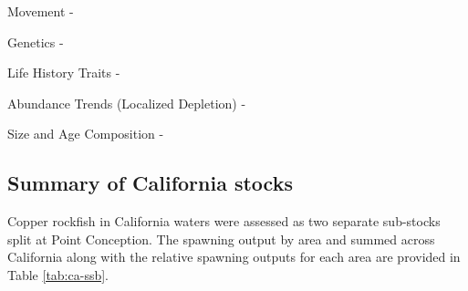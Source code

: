 \documentclass[11pt,
  english,
  a4paper,
]{article}
\begin{document}
Movement -

\leavevmode\tagmcend\tagstructend\par


Genetics -

\leavevmode\tagmcend\tagstructend\par


Life History Traits -

\leavevmode\tagmcend\tagstructend\par


Abundance Trends (Localized Depletion) -

\leavevmode\tagmcend\tagstructend\par


Size and Age Composition -

\leavevmode\tagmcend\tagstructend\par


\hypertarget{summary-of-california-stocks}{%
\subsection{Summary of California stocks}\label{summary-of-california-stocks}}

\leavevmode\tagmcend\tagstructend


Copper rockfish in California waters were assessed as two separate sub-stocks split at Point Conception. The spawning output by area and summed across California along with the relative spawning outputs for each area are provided in Table \ref{tab:ca-ssb}.

\leavevmode\tagmcend\tagstructend\par

\begingroup\fontsize{10}{12}\selectfont
\begingroup\fontsize{10}{12}\selectfont
\end{document}
